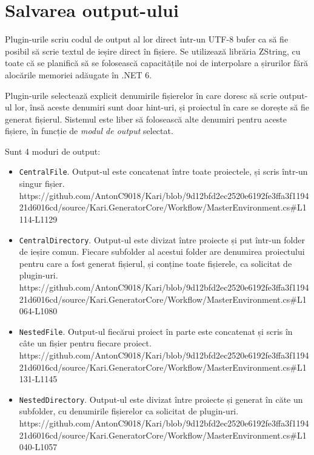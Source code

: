 \documentclass[a4paper,12pt]{report}
\begin{document}
\section{Salvarea output-ului}

Plugin-urile scriu codul de output al lor direct într-un UTF-8 bufer ca să fie posibil să scrie textul de ieșire direct în fișiere.
Se utilizează librăria ZString\cite{zstring_github}, cu toate că se planifică să se folosească capacitățile noi de interpolare a șirurilor fără alocările memoriei adăugate în .NET 6.\cite{string_interpolation_csharp_10}

Plugin-urile selectează explicit denumirile fișierelor în care doresc să scrie output-ul lor, însă aceste denumiri sunt doar hint-uri, și proiectul în care se dorește să fie generat fișierul.
Sistemul este liber să folosească alte denumiri pentru aceste fișiere, în funcție de \emph{modul de output} selectat.

Sunt 4 moduri de output:

\begin{itemize}
\item \texttt{CentralFile}. Output-ul este concatenat între toate proiectele, și scris într-un singur fișier.
  https://github.com/AntonC9018/Kari/blob/9d12bfd2ec2520e6192fe3ffa3f119421d6016cd/source/Kari.GeneratorCore/Workflow/MasterEnvironment.cs#L1114-L1129

\item \texttt{CentralDirectory}. Output-ul este divizat între proiecte și put într-un folder de ieșire comun.
  Fiecare subfolder al acestui folder are denumirea proiectului pentru care a fost generat fișierul, și conține toate fișierele, ca solicitat de plugin-uri.
  https://github.com/AntonC9018/Kari/blob/9d12bfd2ec2520e6192fe3ffa3f119421d6016cd/source/Kari.GeneratorCore/Workflow/MasterEnvironment.cs#L1064-L1080

\item \texttt{NestedFile}. Output-ul fiecărui proiect în parte este concatenat și scris în câte un fișier pentru fiecare proiect.
  https://github.com/AntonC9018/Kari/blob/9d12bfd2ec2520e6192fe3ffa3f119421d6016cd/source/Kari.GeneratorCore/Workflow/MasterEnvironment.cs#L1131-L1145

\item \texttt{NestedDirectory}. Output-ul este divizat între proiecte și generat în căte un subfolder, cu denumirile fișierelor ca solicitat de plugin-uri.
  https://github.com/AntonC9018/Kari/blob/9d12bfd2ec2520e6192fe3ffa3f119421d6016cd/source/Kari.GeneratorCore/Workflow/MasterEnvironment.cs#L1040-L1057
\end{itemize}
\end{document}

